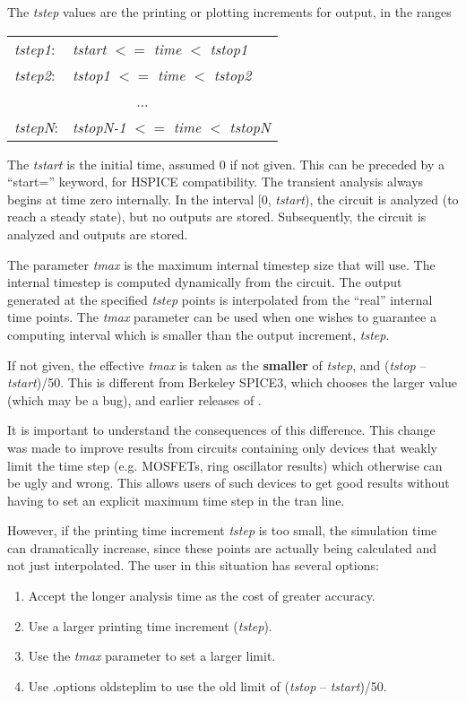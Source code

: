 The {\it tstep} values are the printing or plotting increments for
output, in the ranges

\begin{tabular}{ll}
{\it tstep1\/}: & {\it tstart} $<=$ {\it time} $<$ {\it tstop1}\\
{\it tstep2\/}: & {\it tstop1} $<=$ {\it time} $<$ {\it tstop2}\\
\multicolumn{2}{c}{...}\\
{\it tstepN\/}: & {\it tstopN-1} $<=$ {\it time} $<$ {\it tstopN}\\
\end{tabular}

The {\it tstart} is the initial time, assumed 0 if not given.  This
can be preceded by a ``{\vt start=}'' keyword, for HSPICE
compatibility.  The transient analysis always begins at time zero
internally.  In the interval [0, {\it tstart\/}), the circuit is
analyzed (to reach a steady state), but no outputs are stored. 
Subsequently, the circuit is analyzed and outputs are stored.

The parameter {\it tmax\/} is the maximum internal timestep size that
{\WRspice} will use.  The internal timestep is computed dynamically
from the circuit.  The output generated at the specified {\it tstep}
points is interpolated from the ``real'' internal time points.  The
{\it tmax} parameter can be used when one wishes to guarantee a
computing interval which is smaller than the output increment, {\it
tstep\/}.

If not given, the effective {\it tmax} is taken as the {\bf smaller}
of {\it tstep\/}, and ({\it tstop} -- {\it tstart\/})/50.  This is
different from Berkeley SPICE3, which chooses the larger value (which
may be a bug), and earlier releases of {\WRspice}.

It is important to understand the consequences of this difference. 
This change was made to improve results from circuits containing only
devices that weakly limit the time step (e.g.  MOSFETs, ring
oscillator results) which otherwise can be ugly and wrong.  This
allows users of such devices to get good results without having to set
an explicit maximum time step in the tran line. 
 
However, if the printing time increment {\it tstep} is too small, the
simulation time can dramatically increase, since these points are
actually being calculated and not just interpolated.  The user in this
situation has several options:

\begin{enumerate}
\item{Accept the longer analysis time as the cost of greater accuracy.}
\item{Use a larger printing time increment ({\it tstep\/}).}
\item{ Use the {\it tmax} parameter to set a larger limit.}
\item{Use {\vt .options oldsteplim} to
use the old limit of ({\it tstop\/} -- {\it tstart\/})/50.}
\end{enumerate}

